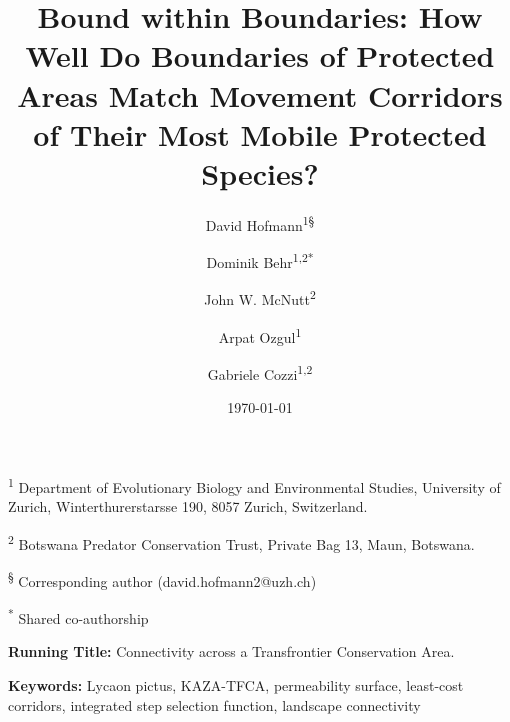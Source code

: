 \documentclass[abstract=on,10pt,a4paper,bibliography=totocnumbered]{article}
\title{Bound within Boundaries: How Well Do Boundaries of Protected Areas Match
Movement Corridors of Their Most Mobile Protected Species?}
\author{
  David Hofmann\textsuperscript{1\S*} \and
  Dominik Behr\textsuperscript{1,2*} \and
  John W. McNutt\textsuperscript{2} \and
  Arpat Ozgul\textsuperscript{1} \and
  Gabriele Cozzi\textsuperscript{1,2}
}
\date{\today}
\begin{document}



\maketitle

\begin{flushleft}

\vspace{0.5cm}

\textsuperscript{1} Department of Evolutionary Biology and Environmental
Studies, University of Zurich, Winterthurerstarsse 190, 8057 Zurich,
Switzerland.

\textsuperscript{2} Botswana Predator Conservation Trust, Private Bag 13, Maun,
Botswana.

\textsuperscript{\S} Corresponding author (david.hofmann2@uzh.ch)

\textsuperscript{*} Shared co-authorship

\vspace{4cm}

\textbf{Running Title:} Connectivity across a Transfrontier Conservation Area.

\vspace{0.5cm}

\textbf{Keywords:} Lycaon pictus, KAZA-TFCA, permeability surface, least-cost
corridors, integrated step selection function, landscape connectivity

\end{flushleft}
\end{document}
